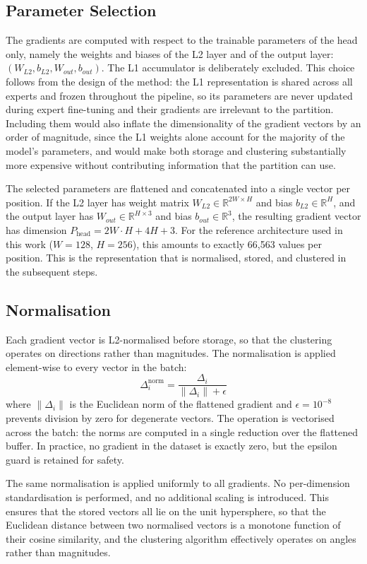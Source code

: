 \subsection{Parameter Selection}

The gradients are computed with respect to the trainable parameters of the head only, namely the weights and biases of the L2 layer and of the output layer: $(W_{L2}, b_{L2}, W_{out}, b_{out})$. The L1 accumulator is deliberately excluded. This choice follows from the design of the method: the L1 representation is shared across all experts and frozen throughout the pipeline, so its parameters are never updated during expert fine-tuning and their gradients are irrelevant to the partition. Including them would also inflate the dimensionality of the gradient vectors by an order of magnitude, since the L1 weights alone account for the majority of the model's parameters, and would make both storage and clustering substantially more expensive without contributing information that the partition can use.

The selected parameters are flattened and concatenated into a single vector per position. If the L2 layer has weight matrix $W_{L2} \in \mathbb{R}^{2W \times H}$ and bias $b_{L2} \in \mathbb{R}^{H}$, and the output layer has $W_{out} \in \mathbb{R}^{H \times 3}$ and bias $b_{out} \in \mathbb{R}^{3}$, the resulting gradient vector has dimension $P_{\text{head}} = 2W \cdot H + 4H + 3$. For the reference architecture used in this work ($W=128$, $H=256$), this amounts to exactly 66,563 values per position. This is the representation that is normalised, stored, and clustered in the subsequent steps.

\subsection{Normalisation}
Each gradient vector is L2-normalised before storage, so that the clustering operates on directions rather than magnitudes. The normalisation is applied element-wise to every vector in the batch:
$$\Delta_i^{\text{norm}} = \frac{\Delta_i}{\|\Delta_i\| + \epsilon}$$
where $\|\Delta_i\|$ is the Euclidean norm of the flattened gradient and $\epsilon = 10^{-8}$ prevents division by zero for degenerate vectors. The operation is vectorised across the batch: the norms are computed in a single reduction over the flattened buffer. In practice, no gradient in the dataset is exactly zero, but the epsilon guard is retained for safety.

The same normalisation is applied uniformly to all gradients. No per-dimension standardisation is performed, and no additional scaling is introduced. This ensures that the stored vectors all lie on the unit hypersphere, so that the Euclidean distance between two normalised vectors is a monotone function of their cosine similarity, and the clustering algorithm effectively operates on angles rather than magnitudes.

